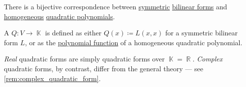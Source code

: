 \begin{proposition}\label{thm:quadratic_forms}
  There is a bijective correspondence between \hyperref[def:symmetric_function]{symmetric} \hyperref[def:bilinear_form]{bilinear forms} and \hyperref[def:homogeneous_polynomial]{homogeneous} \hyperref[def:polynomial_degree]{quadratic polynomials}.

  A  \( Q: V \to \BbbK \) is defined as either \( Q(x) \coloneqq L(x, x) \) for a symmetric bilinear form \( L \), or as the \hyperref[thm:polynomial_algebra_universal_property]{polynomial function} of a homogeneous quadratic polynomial.

  \emph{Real} quadratic forms are simply quadratic forms over \( \BbbK = \BbbR \). \emph{Complex} quadratic forms, by contrast, differ from the general theory --- see \cref{rem:complex_quadratic_form}.
\end{proposition}
